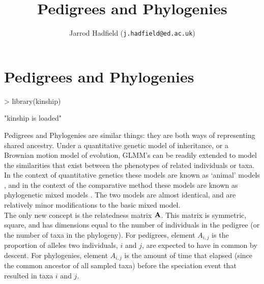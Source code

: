 \documentclass{article}
\title{Pedigrees and Phylogenies}
\author{Jarrod Hadfield (\texttt{j.hadfield@ed.ac.uk})}
\begin{document}
\maketitle
\else
\chapter{Pedigrees and Phylogenies}
\label{chap6}
\fi
\begin{Schunk}
\begin{Sinput}
> library(kinship)
\end{Sinput}
\begin{Soutput}
[1] "kinship is loaded"
\end{Soutput}
\end{Schunk}



Pedigrees and Phylogenies are similar things: they are both ways of representing shared ancestry. Under a quantitative genetic model of inheritance, or a Brownian motion model of evolution, GLMM's can be readily extended to model the similarities that exist between the phenotypes of related individuals or taxa.  In the context of quantitative genetics these models are known as `animal' models \citep{Henderson.1976}, and in the context of the comparative method these models are known as phylogenetic mixed models \citep{Lynch.1991}. The two models are almost identical, and are relatively minor modifications to the basic mixed model.\\

The only new concept is the relatedness matrix ${\bf A}$. This matrix is symmetric, square, and has dimensions equal to the number of individuals in the pedigree (or the number of taxa in the phylogeny). For pedigrees, element $A_{i,j}$ is the proportion of alleles two individuals, $i$ and $j$, are expected to have in  common by descent. For phylogenies, element $A_{i,j}$ is the amount of time that elapsed (since the common ancestor of all sampled taxa) before the speciation event that resulted in taxa $i$ and $j$. 
\end{document}
